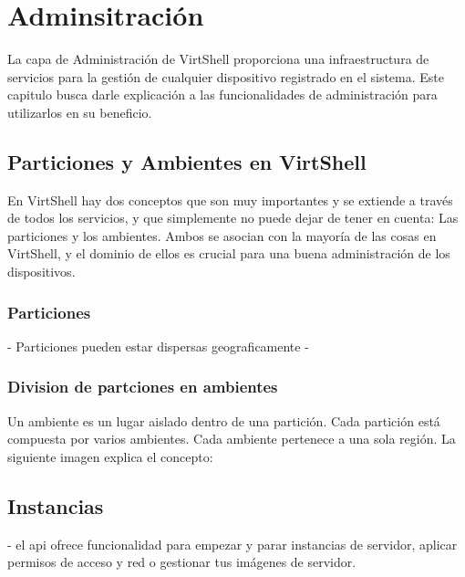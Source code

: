 \chapter{Adminsitración}
\label{capadministracion}

La capa de Administración de VirtShell proporciona una infraestructura de servicios para la gestión de cualquier dispositivo registrado en el sistema. Este capitulo busca darle explicación a las funcionalidades de administración para utilizarlos en su beneficio.

\section{Particiones y Ambientes en VirtShell}
En VirtShell hay dos conceptos que son muy importantes y se extiende a través de todos los servicios, y que simplemente no puede dejar de tener en cuenta: Las particiones y los ambientes. Ambos se asocian con la mayoría de las cosas en VirtShell, y el dominio de ellos es crucial para una buena administración de los dispositivos. 

\subsection{Particiones}
- Particiones pueden estar dispersas geograficamente
- 


\subsection{Division de partciones en ambientes}
Un ambiente es un lugar aislado dentro de una partición. Cada partición está compuesta por varios ambientes. Cada ambiente pertenece a una sola región. La siguiente imagen explica el concepto:

\section{Instancias}
- el api ofrece funcionalidad para empezar y parar instancias de servidor, aplicar permisos de acceso y red o gestionar tus imágenes de servidor.


